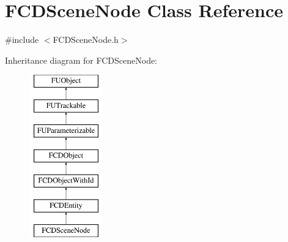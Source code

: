 \hypertarget{classFCDSceneNode}{
\section{FCDSceneNode Class Reference}
\label{classFCDSceneNode}
}


{\ttfamily \#include $<$FCDSceneNode.h$>$}

Inheritance diagram for FCDSceneNode:\begin{figure}[H]
\begin{center}
\leavevmode
\includegraphics[height=7.000000cm]{classFCDSceneNode}
\end{center}
\end{figure}
